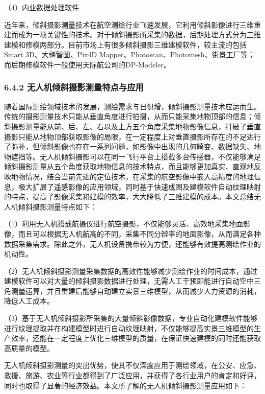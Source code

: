 （4）内业数据处理软件

近年来，倾斜摄影测量技术在航空测绘行业飞速发展，它利用倾斜影像进行三维重建而成为一项关键性的技术。对于倾斜摄影所采集的数据，后期处理方式分为三维建模和修模两部分。目前市场上有很多倾斜摄影三维建模软件，较主流的包括Smart 3D、大疆智图、Pix4D Mapper、Photoscan、Photomesh、街景工厂等；而后期修模软件一般使用天际航公司的DP-Modeler。

\subsubsection{6.4.2 无人机倾斜摄影测量特点与应用}\label{ux65e0ux4ebaux673aux503eux659cux6444ux5f71ux6d4bux91cfux7279ux70b9ux4e0eux5e94ux7528}

随着国际测绘领域技术的发展，测绘需求与日俱增，倾斜摄影测量技术应运而生。传统的摄影测量技术只能从垂直角度进行拍摄，从而只能采集地物顶部的信息；倾斜摄影测量能从前、后、左、右以及上方五个角度采集地物影像信息，打破了垂直摄影只能从地物顶部获取影像的局限，在一定程度上对垂直摄影所存在的不足进行了弥补，但倾斜影像也存在一系列问题，如影像中出现的几何畸变、数据缺失、地物遮挡等。无人机倾斜摄影可以在同一飞行平台上搭载多台传感器，不仅能够满足倾斜摄影测量从五个角度获取地物信息的技术特点，而且能够更加真实、直观地反映地物情况，结合当前先进的定位技术，在采集的航空影像中嵌入高精度的地理信息，极大扩展了遥感影像的应用领域，同时基于快速成图及建模软件自动纹理映射的特点，提高了影像采集和建模的效率，大大降低了三维建模的成本。本文总结无人机倾斜摄影测量特点如下：

（1）利用无人机搭载航摄仪进行航空摄影，不仅能够灵活、高效地采集地面影像，而且可以根据无人机航高的不同，采集不同分辨率的地面影像，从而满足各种数据采集需求。除此之外，无人机设备携带较为方便，还能够有效提高测绘作业的机动性。

（2）无人机倾斜摄影测量采集数据的高效性能够减少测绘作业的时间成本，通过建模软件可以对大量的倾斜摄影数据进行处理，无需人工干预即能进行自动空中三角测量运算，并且重建后能够自动建立实景三维模型，从而减少人力资源的消耗，降低人工成本。

（3）基于无人机倾斜摄影所采集的大量倾斜影像数据，专业自动化建模软件能够进行纹理提取并在构建模型时进行自动纹理映射，不仅能够提高实景三维模型的生产效率，还能在一定程度上优化三维模型的质量，在保证快速建模的同时还能获取高质量的模型。

无人机倾斜摄影测量的突出优势，使其不仅深度应用于测绘领域，在公安、应急、救援、旅游、农业等行业都得到了广泛应用，并获得了各行业用户的肯定和好评，同时也取得了显著的经济效益。本文所了解的无人机倾斜摄影测量应用如下：

